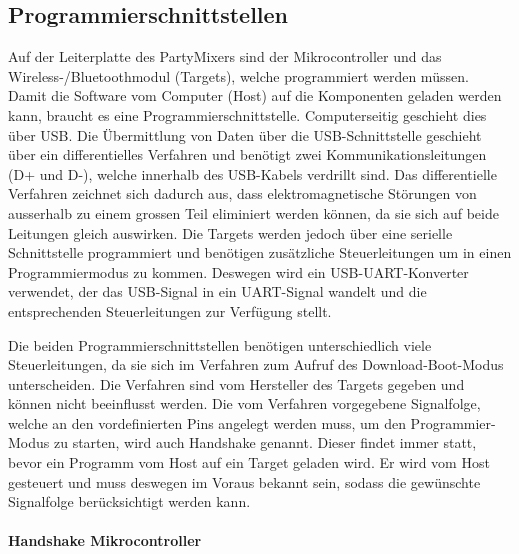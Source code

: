 \subsection{Programmierschnittstellen}
\label{subsec:Programmierschnittstellen}

Auf der Leiterplatte des PartyMixers sind der Mikrocontroller und das Wireless-/Bluetoothmodul (Targets), welche programmiert werden müssen. Damit die Software vom Computer (Host) auf die Komponenten geladen werden kann, braucht es eine Programmierschnittstelle. Computerseitig geschieht dies über USB.
Die Übermittlung von Daten über die USB-Schnittstelle geschieht über ein differentielles Verfahren und benötigt zwei Kommunikationsleitungen (D+ und D-), welche innerhalb des USB-Kabels verdrillt sind. Das differentielle Verfahren zeichnet sich dadurch aus, dass elektromagnetische Störungen von ausserhalb zu einem grossen Teil eliminiert werden können, da sie sich auf beide Leitungen gleich auswirken. Die Targets werden jedoch über eine serielle Schnittstelle programmiert und benötigen zusätzliche Steuerleitungen um in einen Programmiermodus zu kommen. Deswegen wird ein USB-UART-Konverter verwendet, der das USB-Signal in ein UART-Signal wandelt und die entsprechenden Steuerleitungen zur Verfügung stellt. 

Die beiden Programmierschnittstellen benötigen unterschiedlich viele Steuerleitungen, da sie sich im Verfahren zum Aufruf des Download-Boot-Modus unterscheiden. Die Verfahren sind vom Hersteller des Targets gegeben und können nicht beeinflusst werden.
Die vom Verfahren vorgegebene Signalfolge, welche an den vordefinierten Pins angelegt werden muss, um den Programmier-Modus zu starten, wird auch Handshake genannt. Dieser findet immer statt, bevor ein Programm vom Host auf ein Target geladen wird.
Er wird vom Host gesteuert und muss deswegen im Voraus bekannt sein, sodass die gewünschte Signalfolge berücksichtigt werden kann.

\paragraph{Handshake Mikrocontroller}\mbox{}

